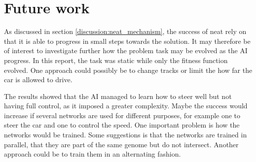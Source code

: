 



\chapter{Future work}
As discussed in section \ref{discussion:neat_mechanism}, the success of neat rely on that it is able to progress in small steps towards the solution. It may therefore be of interest to investigate further how the problem task may be evolved as the AI progress. In this report, the task was static while only the fitness function evolved. One approach could possibly be to change tracks or limit the how far the car is allowed to drive.

The results showed that the AI managed to learn how to steer well but not having full control, as it imposed a greater complexity. Maybe the success would increase if several networks are used for different purposes, for example one to steer the car and one to control the speed. One important problem is how the networks would be trained. Some suggestions is that the networks are trained in parallel, that they are part of the same genome but do not intersect. Another approach could be to train them in an alternating fashion.


